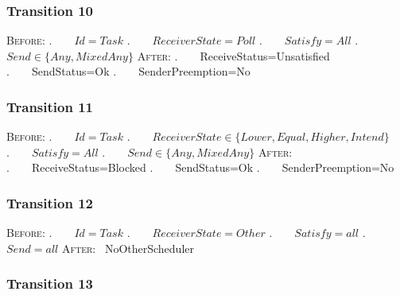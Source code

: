\subsubsection{Transition 10}


\textsc{Before:}
\newline.~~~~$Id=Task$
\newline.~~~~$ReceiverState=Poll$
\newline.~~~~$Satisfy=All$
\newline.~~~~$Send \in \{Any,MixedAny\}$
\newline\textsc{After:}
\newline.~~~~ReceiveStatus=Unsatisfied
\newline.~~~~SendStatus=Ok
\newline.~~~~SenderPreemption=No

\subsubsection{Transition 11}


\textsc{Before:}
\newline.~~~~$Id=Task$
\newline.~~~~$ReceiverState \in \{Lower,Equal,Higher,Intend\}$
\newline.~~~~$Satisfy=All$
\newline.~~~~$Send \in \{Any,MixedAny\}$
\newline\textsc{After:}
\newline.~~~~ReceiveStatus=Blocked
\newline.~~~~SendStatus=Ok
\newline.~~~~SenderPreemption=No

\subsubsection{Transition 12}


\textsc{Before:}
\newline.~~~~$Id=Task$
\newline.~~~~$ReceiverState=Other$
\newline.~~~~$Satisfy=all$
\newline.~~~~$Send=all$
\newline\textsc{After:}
\newline~NoOtherScheduler

\subsubsection{Transition 13}



